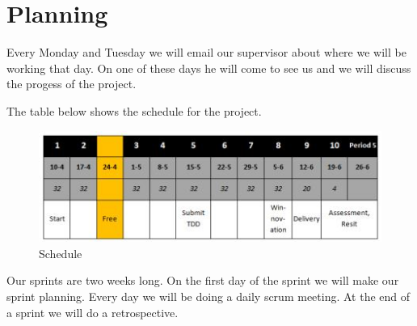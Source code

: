 \section{Planning}
Every Monday and Tuesday we will email our supervisor about where we will be working that day. On one of these days he will come to see us and we will discuss the progess of the project. 

The table below shows the schedule for the project.
\begin{figure}[!htb]
    \centering
    \includegraphics[scale=1.25]{images/schedule.JPG}
    \caption{Schedule}\label{fig:fuzzy-distance}
\end{figure}

Our sprints are two weeks long. On the first day of the sprint we will make our sprint planning. Every day we will be doing a daily scrum meeting. At the end of a sprint we will do a retrospective.

